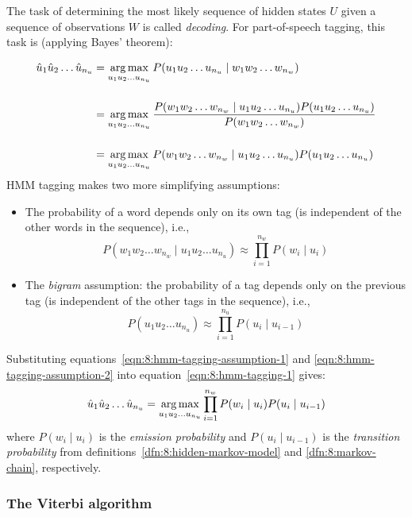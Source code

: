 The task of determining the most likely sequence of hidden states $U$ given a
sequence of observations $W$ is called \textit{decoding}.
For part-of-speech tagging, this task is (applying Bayes' theorem):

\begin{align}
  \hat{u}_1 \hat{u}_2 \dots \hat{u}_{n_u}
   & = \operatorname*{arg\,max}_{u_1 u_2 \dots u_{n_u}}
  P(u_1 u_2 \dots u_{n_u} \mid w_1 w_2 \dots w_{n_w})                                                           \\[3ex]
   & = \operatorname*{arg\,max}_{u_1 u_2 \dots u_{n_u}}
  \frac{P(w_1 w_2 \dots w_{n_w} \mid u_1 u_2 \dots u_{n_u}) P(u_1 u_2 \dots u_{n_u})}{P(w_1 w_2 \dots w_{n_w})} \\[3ex]
   & = \operatorname*{arg\,max}_{u_1 u_2 \dots u_{n_u}}
  P(w_1 w_2 \dots w_{n_w} \mid u_1 u_2 \dots u_{n_u}) P(u_1 u_2 \dots u_{n_u})
  \label{eqn:8:hmm-tagging-1}
\end{align}
HMM tagging makes two more simplifying assumptions:
\begin{itemize}
  \item The probability of a word depends only on its own tag (is independent of
        the other words in the sequence), i.e.,
        \begin{equation}
          \label{eqn:8:hmm-tagging-assumption-1}
          P(w_1 w_2 \dots w_{n_w} \mid u_1 u_2 \dots u_{n_u})
          \approx \prod_{i = 1}^{n_w} P(w_i \mid u_i)
        \end{equation}
  \item The \textit{bigram} assumption: the probability of a tag depends only on
        the previous tag (is independent of the other tags in the sequence),
        i.e.,
        \begin{equation}
          \label{eqn:8:hmm-tagging-assumption-2}
          P(u_1 u_2 \dots u_{n_u})
          \approx \prod_{i = 1}^{n_u} P(u_i \mid u_{i - 1})
        \end{equation}
\end{itemize}
Substituting equations~\ref{eqn:8:hmm-tagging-assumption-1} and
\ref{eqn:8:hmm-tagging-assumption-2} into equation~\ref{eqn:8:hmm-tagging-1}
gives:
\begin{equation}
  \hat{u}_1 \hat{u}_2 \dots \hat{u}_{n_u}
  = \operatorname*{arg\,max}_{u_1 u_2 \dots u_{n_u}}
  \prod_{i = 1}^{n_w} P(w_i \mid u_i) P(u_i \mid u_{i - 1})
\end{equation}
where $P(w_i \mid u_i)$ is the \textit{emission probability} and
$P(u_i \mid u_{i - 1})$ is the \textit{transition probability} from
definitions~\ref{dfn:8:hidden-markov-model} and \ref{dfn:8:markov-chain},
respectively.

\subsubsection{The Viterbi algorithm}
